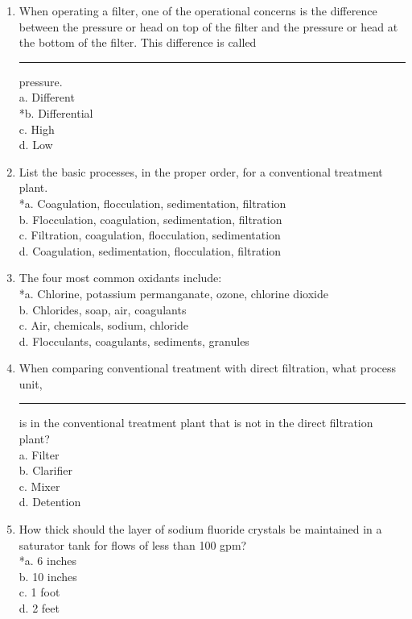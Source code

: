 \begin{enumerate}
\item When operating a filter, one of the operational concerns is the difference between the pressure or head on top of the filter and the pressure or head at the bottom of the filter. This difference is called \rule{1.5cm}{0.5pt} pressure.\\
a. Different\\
*b. Differential\\
c. High\\
d. Low\\
\item List the basic processes, in the proper order, for a conventional treatment plant.\\
*a. Coagulation, flocculation, sedimentation, filtration\\
b. Flocculation, coagulation, sedimentation, filtration\\
c. Filtration, coagulation, flocculation, sedimentation\\
d. Coagulation, sedimentation, flocculation, filtration\\
\item The four most common oxidants include:\\
*a. Chlorine, potassium permanganate, ozone, chlorine dioxide\\
b. Chlorides, soap, air, coagulants\\
c. Air, chemicals, sodium, chloride\\
d. Flocculants, coagulants, sediments, granules\\
\item When comparing conventional treatment with direct filtration, what process unit, \rule{1.5cm}{0.5pt} is in the conventional treatment plant that is not in the direct filtration plant?\\
a. Filter\\
b. Clarifier\\
c. Mixer\\
d. Detention\\

 \item How thick should the layer of sodium fluoride crystals be maintained in a saturator tank for flows of less than 100 gpm?\\
*a. 6 inches\\
b. 10 inches\\
c. 1 foot\\
d. 2 feet\\




\end{enumerate}
